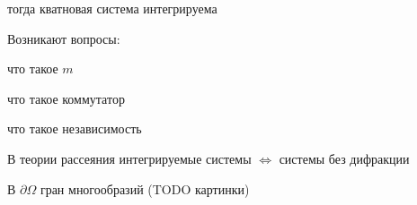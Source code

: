 тогда кватновая система интегрируема

Возникают вопросы:
\begin{enumeration}
  \item что такое $m$
  \item что такое коммутатор
  \item что такое независимость
\end{enumeration}



В теории рассеяния интегрируемые системы $\Leftrightarrow$ системы без дифракции

В $\partial\Omega$ гран многообразий
(TODO картинки)


